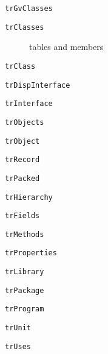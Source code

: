 \documentclass{report}
\begin{document}
\begin{list}{}
\begin{description}
\item[\texttt{trGvClasses}] \label{PasDoc_Languages-trGvClasses}
\index{}
 
\item[\texttt{trClasses}] \label{PasDoc_Languages-trClasses}
\index{}
tables and members
\item[\texttt{trClass}] \label{PasDoc_Languages-trClass}
\index{}
 
\item[\texttt{trDispInterface}] \label{PasDoc_Languages-trDispInterface}
\index{}
 
\item[\texttt{trInterface}] \label{PasDoc_Languages-trInterface}
\index{}
 
\item[\texttt{trObjects}] \label{PasDoc_Languages-trObjects}
\index{}
 
\item[\texttt{trObject}] \label{PasDoc_Languages-trObject}
\index{}
 
\item[\texttt{trRecord}] \label{PasDoc_Languages-trRecord}
\index{}
 
\item[\texttt{trPacked}] \label{PasDoc_Languages-trPacked}
\index{}
 
\item[\texttt{trHierarchy}] \label{PasDoc_Languages-trHierarchy}
\index{}
 
\item[\texttt{trFields}] \label{PasDoc_Languages-trFields}
\index{}
 
\item[\texttt{trMethods}] \label{PasDoc_Languages-trMethods}
\index{}
 
\item[\texttt{trProperties}] \label{PasDoc_Languages-trProperties}
\index{}
 
\item[\texttt{trLibrary}] \label{PasDoc_Languages-trLibrary}
\index{}
 
\item[\texttt{trPackage}] \label{PasDoc_Languages-trPackage}
\index{}
 
\item[\texttt{trProgram}] \label{PasDoc_Languages-trProgram}
\index{}
 
\item[\texttt{trUnit}] \label{PasDoc_Languages-trUnit}
\index{}
 
\item[\texttt{trUses}] \label{PasDoc_Languages-trUses}
\index{}
 

\end{description}
\end{list}
\end{document}
